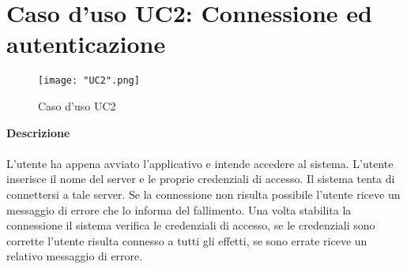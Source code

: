 \documentclass[a4paper]{report}
\begin{document}
	\section{Caso d'uso UC2: Connessione ed autenticazione}
		 	\begin{figure}[H]
				\centering
				\texttt{[image: "UC2".png]}
				\caption{Caso d'uso UC2}
			\end{figure}
		 \textbf{Descrizione} \\ \\
		 L'utente ha appena avviato l'applicativo e intende accedere al sistema. L'utente 
		 inserisce il nome del server e le proprie credenziali di accesso. Il sistema tenta di connettersi a tale
		 server. Se la connessione non risulta possibile l'utente riceve un messaggio di errore che lo informa
		 del fallimento.
		 Una volta stabilita la connessione il sistema verifica le credenziali di accesso, se le credenziali sono
		 corrette l'utente risulta connesso a tutti gli effetti, se sono errate riceve un relativo messaggio di 
		 errore.
\end{document}
